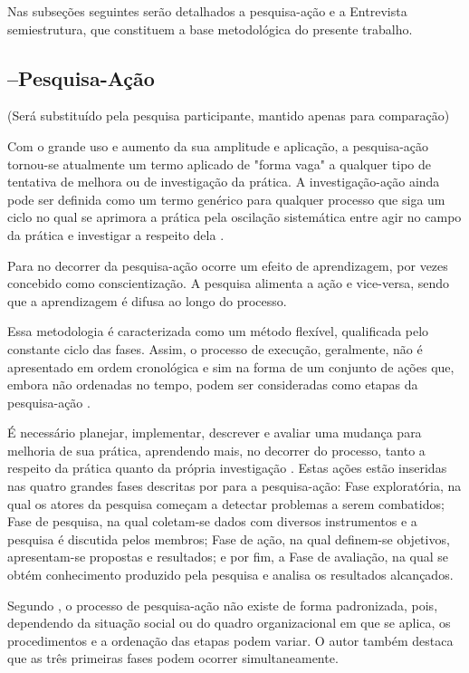 Nas subseções seguintes serão detalhados a pesquisa-ação e a Entrevista semiestrutura, que constituem a base metodológica do presente trabalho.

\subsection{--Pesquisa-Ação}

(Será substituído pela pesquisa participante, mantido apenas para comparação)

Com o grande uso e aumento da sua amplitude e aplicação, a pesquisa-ação tornou-se atualmente um termo aplicado de "forma vaga" a qualquer tipo de tentativa de melhora ou de investigação da prática. A investigação-ação ainda pode ser definida como um termo genérico para qualquer processo que siga um ciclo no qual se aprimora a prática pela oscilação sistemática entre agir no campo da prática e investigar a respeito dela \cite{tripp2005pesquisa}.

Para  no decorrer da pesquisa-ação ocorre um efeito de aprendizagem, por vezes concebido como conscientização. A pesquisa alimenta a ação e vice-versa, sendo que a aprendizagem é difusa ao longo do processo.

Essa metodologia é caracterizada como um método flexível, qualificada pelo constante ciclo das fases. Assim, o processo de execução, geralmente, não é apresentado em ordem cronológica e sim na forma de um conjunto de ações que, embora não ordenadas no tempo, podem ser consideradas como etapas da pesquisa-ação \cite{gil2002,thiollent2011metodologia}.

É necessário planejar, implementar, descrever e avaliar uma mudança para melhoria de sua prática, aprendendo mais, no decorrer do processo, tanto a respeito da prática quanto da própria investigação \cite{tripp2005pesquisa}. Estas ações estão inseridas nas quatro grandes fases descritas por  para a pesquisa-ação: Fase exploratória, na qual os atores da pesquisa começam a detectar problemas a serem combatidos; Fase de pesquisa, na qual coletam-se dados com diversos instrumentos e a pesquisa é discutida pelos membros; Fase de ação, na qual definem-se objetivos, apresentam-se propostas e resultados; e por fim, a Fase de avaliação, na qual se obtém conhecimento produzido pela pesquisa e analisa os resultados alcançados.

Segundo , o processo de pesquisa-ação não existe de forma padronizada, pois, dependendo da situação social ou do quadro organizacional em que se aplica, os procedimentos e a ordenação das etapas podem variar. O autor também destaca que as três primeiras fases podem ocorrer simultaneamente.

